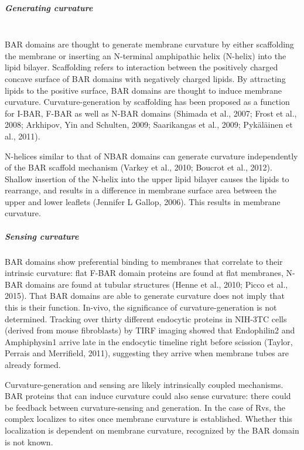 	\vspace{5mm}
			
				\subparagraph{Generating curvature }
				\mbox{}\\
BAR domains are thought to generate membrane curvature by either scaffolding the membrane or inserting an N-terminal amphipathic helix (N-helix) into the lipid bilayer. 
Scaffolding refers to interaction between the positively charged concave surface of BAR domains with negatively charged lipids. By attracting lipids to the positive surface, BAR domains are thought to induce membrane curvature. Curvature-generation by scaffolding has been proposed as a function for I-BAR, F-BAR as well as N-BAR domains (Shimada et al., 2007; Frost et al., 2008; Arkhipov, Yin and Schulten, 2009; Saarikangas et al., 2009; Pykäläinen et al., 2011). 
	\vspace{5mm}
	
N-helices similar to that of NBAR domains can generate curvature independently of the BAR scaffold mechanism (Varkey et al., 2010; Boucrot et al., 2012). Shallow insertion of the N-helix into the upper lipid bilayer causes the lipids to rearrange, and results in a difference in membrane surface area between the upper and lower leaflets (Jennifer L Gallop, 2006). This results in membrane curvature. 


	
	\vspace{5mm}
	
				\subparagraph{Sensing curvature }
BAR domains show preferential binding to membranes that correlate to their intrinsic curvature: flat F-BAR domain proteins are found at flat membranes, N-BAR domains are found at tubular structures (Henne et al., 2010; Picco et al., 2015). That BAR domains are able to generate curvature does not imply that this is their function. In-vivo, the significance of curvature-generation is not determined. Tracking over thirty different endocytic proteins in NIH-3TC cells (derived from mouse fibroblasts) by TIRF imaging showed that Endophilin2 and Amphiphysin1 arrive late in the endocytic timeline right before scission (Taylor, Perrais and Merrifield, 2011), suggesting they arrive when membrane tubes are already formed. 


	\vspace{7mm}
Curvature-generation and sensing are likely intrinsically coupled mechanisms. BAR proteins that can induce curvature could also sense curvature: there could be feedback between curvature-sensing and generation. In the case of Rvs, the complex localizes to sites once membrane curvature is established. Whether this localization is dependent on membrane curvature, recognized by the BAR domain is not known. 




